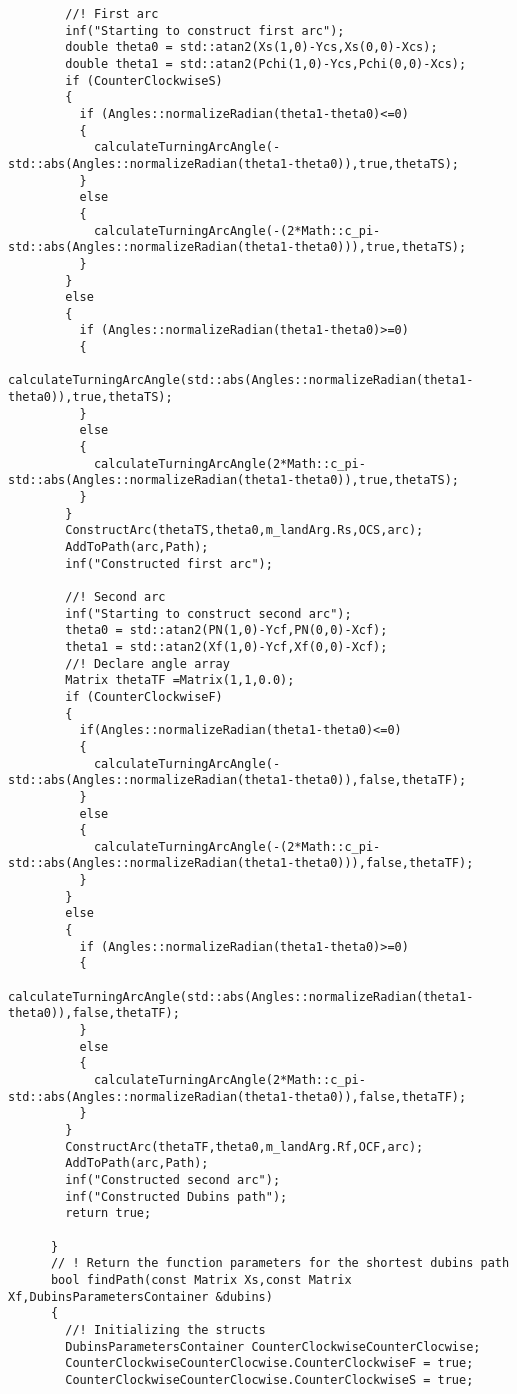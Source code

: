 \begin{frame}[fragile]
\begin{lstlisting}
        //! First arc
        inf("Starting to construct first arc");
        double theta0 = std::atan2(Xs(1,0)-Ycs,Xs(0,0)-Xcs);
        double theta1 = std::atan2(Pchi(1,0)-Ycs,Pchi(0,0)-Xcs);
        if (CounterClockwiseS)
        {
          if (Angles::normalizeRadian(theta1-theta0)<=0)
          {
            calculateTurningArcAngle(-std::abs(Angles::normalizeRadian(theta1-theta0)),true,thetaTS);
          }
          else
          {
            calculateTurningArcAngle(-(2*Math::c_pi-std::abs(Angles::normalizeRadian(theta1-theta0))),true,thetaTS);
          }
        }
        else
        {
          if (Angles::normalizeRadian(theta1-theta0)>=0)
          {
            calculateTurningArcAngle(std::abs(Angles::normalizeRadian(theta1-theta0)),true,thetaTS);
          }
          else
          {
            calculateTurningArcAngle(2*Math::c_pi-std::abs(Angles::normalizeRadian(theta1-theta0)),true,thetaTS);
          }
        }
        ConstructArc(thetaTS,theta0,m_landArg.Rs,OCS,arc);
        AddToPath(arc,Path);
        inf("Constructed first arc");

        //! Second arc
        inf("Starting to construct second arc");
        theta0 = std::atan2(PN(1,0)-Ycf,PN(0,0)-Xcf);
        theta1 = std::atan2(Xf(1,0)-Ycf,Xf(0,0)-Xcf);
        //! Declare angle array
        Matrix thetaTF =Matrix(1,1,0.0);
        if (CounterClockwiseF)
        {
          if(Angles::normalizeRadian(theta1-theta0)<=0)
          {
            calculateTurningArcAngle(-std::abs(Angles::normalizeRadian(theta1-theta0)),false,thetaTF);
          }
          else
          {
            calculateTurningArcAngle(-(2*Math::c_pi-std::abs(Angles::normalizeRadian(theta1-theta0))),false,thetaTF);
          }
        }
        else
        {
          if (Angles::normalizeRadian(theta1-theta0)>=0)
          {
            calculateTurningArcAngle(std::abs(Angles::normalizeRadian(theta1-theta0)),false,thetaTF);
          }
          else
          {
            calculateTurningArcAngle(2*Math::c_pi-std::abs(Angles::normalizeRadian(theta1-theta0)),false,thetaTF);
          }
        }
        ConstructArc(thetaTF,theta0,m_landArg.Rf,OCF,arc);
        AddToPath(arc,Path);
        inf("Constructed second arc");
        inf("Constructed Dubins path");
        return true;

      }
      // ! Return the function parameters for the shortest dubins path
      bool findPath(const Matrix Xs,const Matrix Xf,DubinsParametersContainer &dubins)
      {
        //! Initializing the structs
        DubinsParametersContainer CounterClockwiseCounterClocwise;
        CounterClockwiseCounterClocwise.CounterClockwiseF = true;
        CounterClockwiseCounterClocwise.CounterClockwiseS = true;


\end{lstlisting}
\end{frame}
